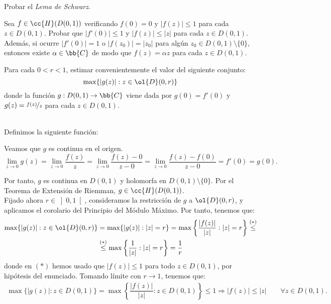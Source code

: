 \documentclass[12pt]{article}
\begin{document}
    \begin{ejercicio}[2.5 puntos]
        Probar el \emph{Lema de Schwarz}.
        \begin{lema*}[de Schwarz]
            Sea $f \in \cc{H}(D(0, 1))$ verificando $f(0) = 0$ y $|f(z)| \leq 1$ para cada $z \in D(0, 1)$. Probar que $|f'(0)| \leq 1$ y $|f(z)| \leq |z|$ para cada $z \in D(0, 1)$. Además, si ocurre $|f'(0)| = 1$ o $|f(z_0)| = |z_0|$ para algún $z_0 \in D(0, 1) \setminus \{0\}$, entonces existe $\alpha \in \bb{C}$ de modo que $f(z) = \alpha z$ para cada $z \in D(0, 1)$.
        \end{lema*}
        \begin{observacion}
            Para cada $0 < r < 1$, estimar convenientemente el valor del siguiente conjunto: $$\max\{ |g(z)| : z \in \ol{D}(0, r) \}$$ donde la función $g : D(0, 1) \to \bb{C}$ viene dada por $g(0) = f'(0)$ y $g(z) = \nicefrac{f(z)}{z}$ para cada $z \in D(0, 1)$.
        \end{observacion}~\\

        Definimos la siguiente función:

        Veamos que $g$ es continua en el origen.
        \begin{equation*}
            \lim_{z\to 0} g(z) = \lim_{z\to 0} \frac{f(z)}{z} = \lim_{z\to 0} \frac{f(z) - 0}{z - 0} = \lim_{z\to 0} \dfrac{f(z)-f(0)}{z-0} = f'(0) = g(0).
        \end{equation*}

        Por tanto, $g$ es continua en $D(0, 1)$ y holomorfa en $D(0, 1) \setminus \{0\}$. Por el Teorema de Extensión de Riemman, $g\in \cc{H}(D(0, 1))$.\\

        Fijado ahora $r\in \left]0,1\right[$, consideramos la restricción de $g$ a $\ol{D}(0, r)$, y aplicamos el corolario del Principio del Módulo Máximo. Por tanto, tenemos que:
        \begin{align*}
            \max\{ |g(z)| : z \in \ol{D}(0, r) \} &= \max\{ |g(z)| : |z| = r \}
            = \max\left\{\dfrac{|f(z)|}{|z|} : |z| = r\right\}
            \stackrel{(\ast)}{\leq}\\&\stackrel{(\ast)}{\leq} \max\left\{\dfrac{1}{|z|} : |z| = r\right\} = \frac{1}{r}
        \end{align*}
        donde en $(\ast)$ hemos usado que $|f(z)| \leq 1$ para todo $z\in D(0, 1)$, por hipótesis del enunciado. Tomando límite con $r\to 1$, tenemos que:
        \begin{align*}
            \max\{ |g(z)| : z \in D(0, 1) \}
            = \max\left\{ \dfrac{|f(z)|}{|z|} : z \in D(0, 1) \right\}
            \leq 1
            \Longrightarrow
            |f(z)| \leq |z| \qquad \forall z\in D(0, 1).
        \end{align*}


\end{ejercicio}
\end{document}
